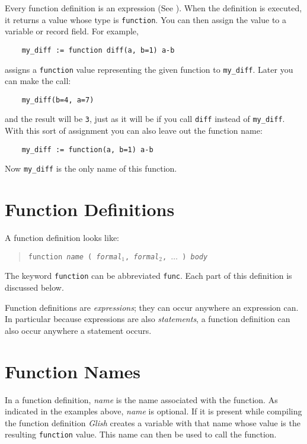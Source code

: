 Every function definition is an expression (See ).  When
the definition is executed, it returns a value whose type is {\tt function}.
You can then assign the value to a variable or record field.  For example,
\begin{verbatim}
    my_diff := function diff(a, b=1) a-b
\end{verbatim}
assigns a {\tt function} value representing the given function to
{\tt my\_diff}.  Later you can make the call:
\begin{verbatim}
    my_diff(b=4, a=7)
\end{verbatim}
and the result will be {\tt 3}, just as it will be if you call
{\tt diff} instead of {\tt my\_diff}.  With this sort of assignment you
can also leave out the function name:
\begin{verbatim}
    my_diff := function(a, b=1) a-b
\end{verbatim}
Now {\tt my\_diff} is the only name of this function.

\section{Function Definitions}

A function definition looks like:
\begin{quote}
    {\tt function {\em name} ( {\em formal$_1$}, {\em formal$_2$}, $\ldots$ ) {\em body}}
\end{quote}
The keyword {\tt function} can be abbreviated {\tt func}.
Each part of this definition is discussed below.

Function definitions are {\em expressions\/}; they can occur anywhere
an expression can.  In particular because expressions are also
{\em statements\/}, a function definition can also occur anywhere
a statement occurs.

\section{Function Names}

In a function definition, {\em name} is the name associated with the function.
As indicated in the examples above, {\em name} is optional.  If it is present
while compiling the function definition {\em Glish} creates a variable
with that name whose value is the resulting {\tt function} value.  This name
can then be used to call the function.

